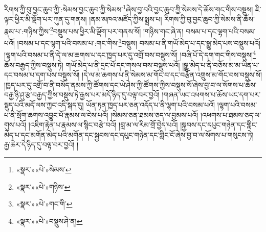 རིགས་ཀྱི་བུ་བྱང་ཆུབ་ཀྱི་:སེམས་བྱང་ཆུབ་ཀྱི་སེམས་\footnote{«སྣར་»«པེ་»སེམས་}ཞེས་བྱ་བའི་བྱང་ཆུབ་ཀྱི་སེམས་དེ་ཆོས་གང་གིས་བསྡུས། ཇི་ལྟར་ཕྱིར་མི་ལྡོག་པར་ཀུན་དུ་གནས། །ནམ་མཁའ་མཛོད་ཀྱིས་སྨྲས་པ། རིགས་ཀྱི་བུ་བྱང་ཆུབ་ཀྱི་སེམས་ནི་ཆོས་རྣམ་པ་:གཉིས་ཀྱིས་\footnote{«སྣར་»«པེ་»གཉིས་}བསྡུས་པས་ཕྱིར་མི་ལྡོག་པར་གནས་སོ། །གཉིས་གང་ཞེ་ན། བསམ་པ་དང་ལྷག་པའི་བསམ་པའོ། །བསམ་པ་དང་ལྷག་པའི་བསམ་པ་:གང་གིས་\footnote{«སྣར་»«པེ་»གང་གི་}བསྡུས། བསམ་པ་ནི་གཡོ་མེད་པ་དང་སྒྱུ་མེད་པས་བསྡུས་པའོ། །ལྷག་པའི་བསམ་པ་ནི་དེ་ལ་མ་ཆགས་པ་དང་ཁྱད་པར་དུ་འགྲོ་བས་བསྡུས་སོ། །བཞི་པོ་དེ་དག་གང་གིས་བསྡུས།\footnote{«སྣར་»«པེ་»བསྡུས་ཤེ་ན།} ཆོས་བརྒྱད་ཀྱིས་བསྡུས་ཏེ། གཡོ་མེད་པ་ནི་དྲང་པོ་དང་གསལ་བས་བསྡུས་པའོ། །སྒྱུ་མེད་པ་ནི་བཅོས་མ་མ་ཡིན་པ་དང་བསམ་པ་དག་པས་བསྡུས་སོ། །དེ་ལ་མ་ཆགས་པ་ནི་སེམས་མ་གོང་བ་དང་བརྩོན་འགྲུས་མ་གོང་བས་བསྡུས་སོ། །ཁྱད་པར་དུ་འགྲོ་བ་ནི་བསོད་ནམས་ཀྱི་ཚོགས་དང་ཡེ་ཤེས་ཀྱི་ཚོགས་ཀྱིས་བསྡུས་སོ་ཞེས་བྱ་བ་ལ་སོགས་པ་ཆོས་བརྒྱ་ཉི་ཤུ་རྩ་བརྒྱད་ཀྱིས་བསྡུས་ཏེ་རྒྱས་པར་མདོ་ཉིད་དུ་བལྟ་བར་བྱའོ། །གཞན་ཡང་འཕགས་པ་ཆོས་ཡང་དག་པར་སྡུད་པའི་མདོ་ལས་ཀྱང་འདི་སྐད་དུ། ཡོན་ཏན་ཁྱད་པར་ཅན་འདོད་པ་ནི་ལྷག་པའི་བསམ་པའོ། །ལྷག་པའི་བསམ་པ་ནི་སྲོག་ཆགས་འབྱུང་པོ་རྣམས་ལ་ངེས་པའོ། །སེམས་ཅན་ཐམས་ཅད་ལ་བྱམས་པའོ། །འཕགས་པ་ཐམས་ཅད་ལ་གུས་པའོ། །འཇིག་རྟེན་པ་རྣམས་ལ་སྙིང་བརྩེ་བའོ། །བླ་མ་ལ་རིམ་གྲོ་བྱེད་པའོ། །སྐྱབས་དང་དཔུང་གཉེན་དང་གླིང་མེད་པ་དང་མགོན་མེད་པའི་མགོན་དང་སྐྱབས་དང་དཔུང་གཉེན་དང་གླིང་ངོ་ཞེས་བྱ་བ་ལ་སོགས་པ་གསུངས་ཏེ། རྒྱ་ཆེར་དེ་ཉིད་དུ་བལྟ་བར་བྱའོ། །
